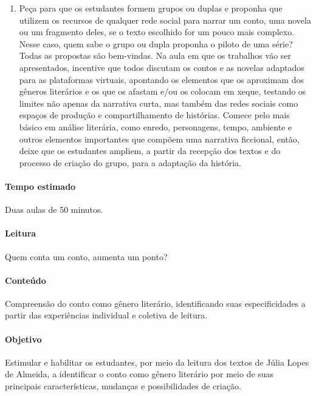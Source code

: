 \documentclass[12pt]{extarticle}
\begin{document}
\begin{enumerate}
\item
Peça para que os estudantes formem grupos ou duplas e proponha que
utilizem os recursos de qualquer rede social para narrar um conto, uma
novela ou um fragmento deles, se o texto escolhido for um pouco mais
complexo. Nesse caso, quem sabe o grupo ou dupla proponha o piloto de
uma série? Todas as propostas são bem-vindas. Na aula em que os
trabalhos vão ser apresentados, incentive que todos discutam os contos e
as novelas adaptados para as plataformas virtuais, apontando os
elementos que os aproximam dos gêneros literários e os que os afastam
e/ou os colocam em xeque, testando os limites não apenas da narrativa
curta, mas também das redes sociais como espaços de produção e
compartilhamento de histórias. Comece pelo mais básico em análise
literária, como enredo, personagens, tempo, ambiente e outros elementos
importantes que compõem uma narrativa ficcional, então, deixe que os
estudantes ampliem, a partir da recepção dos textos e do processo de
criação do grupo, para a adaptação da história.
\end{enumerate}

\paragraph{Tempo estimado} Duas aulas de 50 minutos.




\paragraph{Leitura} Quem conta um conto, aumenta um ponto?




\paragraph{Conteúdo} Compreensão do conto como gênero literário,
identificando suas especificidades a partir das experiências individual
e coletiva de leitura.

\paragraph{Objetivo} Estimular e habilitar os estudantes, por meio da
leitura dos textos de Júlia Lopes de Almeida, a identificar o conto como
gênero literário por meio de suas principais características, mudanças e
possibilidades de criação.
\end{document}
